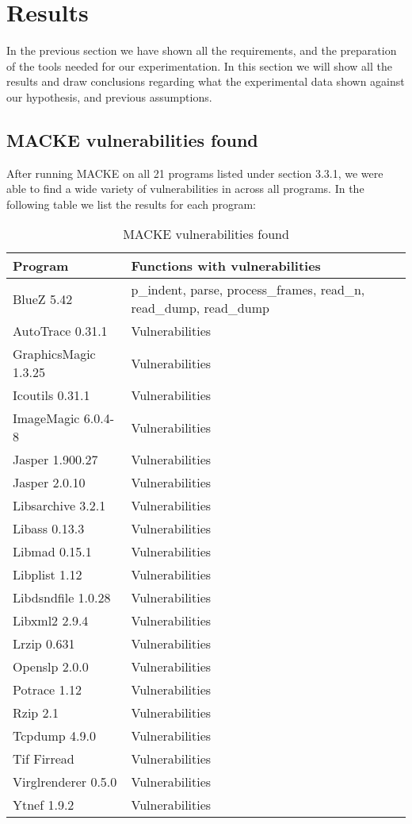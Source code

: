 \section{Results}

In the previous section we have shown all the requirements, and the preparation of the tools needed for our experimentation. In this section we will show all the results and draw conclusions regarding what the experimental data shown against our hypothesis, and previous assumptions. 

\subsection{MACKE vulnerabilities found}

After running MACKE on all 21 programs listed under section 3.3.1, we were able to find a wide variety of vulnerabilities in across all programs. In the following table we list the results for each program:

 \begin{table}[H]
 	\centering
 	\caption{MACKE vulnerabilities found}
 	\begin{tabular}{ |p{4cm}||p{9cm}|  }
 		\hline
 		Program & Functions with vulnerabilities\\
 		\hline
 		BlueZ 5.42   & p\_indent, parse, process\_frames, read\_n, read\_dump, read\_dump \\
 		AutoTrace 0.31.1 &   Vulnerabilities \\
 		GraphicsMagic 1.3.25 & Vulnerabilities \\
 		Icoutils 0.31.1    & Vulnerabilities \\
 		ImageMagic 6.0.4-8    & Vulnerabilities \\
 		Jasper 1.900.27    & Vulnerabilities \\
 		Jasper 2.0.10    & Vulnerabilities \\
 		Libsarchive 3.2.1	& Vulnerabilities \\
 		Libass 0.13.3	& Vulnerabilities \\
 		Libmad 0.15.1	& Vulnerabilities \\
 		Libplist 1.12	& Vulnerabilities \\
 		Libdsndfile 1.0.28	& Vulnerabilities \\
 		Libxml2 2.9.4	& Vulnerabilities \\
 		Lrzip 0.631	& Vulnerabilities \\
 		Openslp 2.0.0	& Vulnerabilities \\
 		Potrace 1.12	& Vulnerabilities \\
 		Rzip 2.1	& Vulnerabilities \\
 		Tcpdump 4.9.0	& Vulnerabilities \\
 		Tif Firread	& Vulnerabilities \\
 		Virglrenderer 0.5.0	& Vulnerabilities \\
 		Ytnef 1.9.2	& Vulnerabilities \\
 		\hline
 	\end{tabular}
 \end{table}

